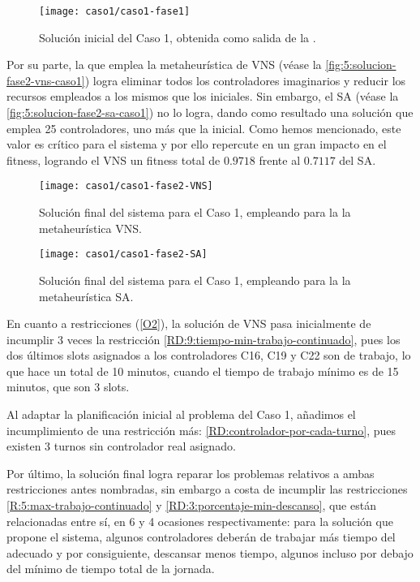 \begin{figure}
	\centering
	\texttt{[image: caso1/caso1-fase1]}
	\caption{Solución inicial del Caso 1, obtenida como salida de la \faseuno{}.}
	\label{fig:5:solucion-fase1-caso1}
\end{figure}

Por su parte, la \fasedos{} que emplea la metaheurística de VNS (véase la \autoref{fig:5:solucion-fase2-vns-caso1}) logra eliminar todos los controladores imaginarios y reducir los recursos empleados a los mismos que los iniciales. Sin embargo, el SA (véase la \autoref{fig:5:solucion-fase2-sa-caso1}) no lo logra, dando como resultado una solución que emplea 25 controladores, uno más que la inicial. Como hemos mencionado, este valor es crítico para el sistema y por ello repercute en un gran impacto en el fitness, logrando el VNS un fitness total de $0.9718$ frente al $0.7117$ del SA. 

\begin{figure}
	\centering
	\texttt{[image: caso1/caso1-fase2-VNS]}
	\caption{Solución final del sistema para el Caso 1, empleando para la \fasedos{} la metaheurística VNS.}
	\label{fig:5:solucion-fase2-vns-caso1}
\end{figure}

\begin{figure} 
	\centering
	\texttt{[image: caso1/caso1-fase2-SA]}
	\caption{Solución final del sistema para el Caso 1, empleando para la \fasedos{} la metaheurística SA.}
	\label{fig:5:solucion-fase2-sa-caso1}
\end{figure}

En cuanto a restricciones (\ref{O2}), la solución de VNS pasa inicialmente de incumplir 3 veces la restricción \ref{RD:9:tiempo-min-trabajo-continuado}, pues los dos últimos slots asignados a los controladores C16, C19 y C22 son de trabajo, lo que hace un total de 10 minutos, cuando el tiempo de trabajo mínimo es de 15 minutos, que son 3 slots.

Al adaptar la planificación inicial al problema del Caso 1, añadimos el incumplimiento de una restricción más: \ref{RD:controlador-por-cada-turno}, pues existen 3 turnos sin controlador real asignado.

Por último, la solución final logra reparar los problemas relativos a ambas restricciones antes nombradas, sin embargo a costa de incumplir las restricciones \ref{R:5:max-trabajo-continuado} y \ref{RD:3:porcentaje-min-descanso}, que están relacionadas entre sí, en 6 y 4 ocasiones respectivamente: para la solución que propone el sistema, algunos controladores deberán de trabajar más tiempo del adecuado y por consiguiente, descansar menos tiempo, algunos incluso por debajo del mínimo de tiempo total de la jornada.


